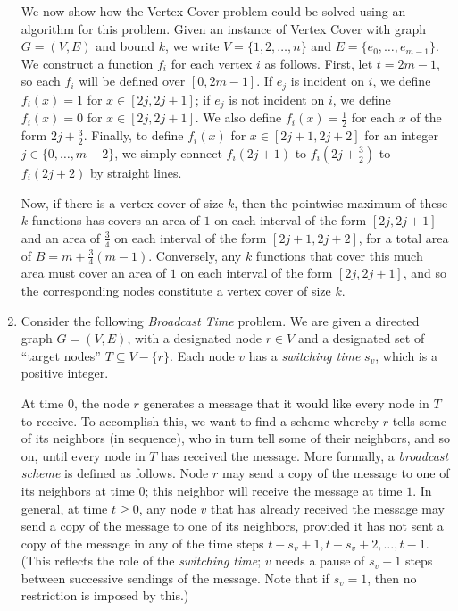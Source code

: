 \documentclass[12pt]{article}
\begin{document}
\begin{enumerate}
{We now show how the Vertex Cover problem could be 
solved using an algorithm for this problem.
Given an instance of Vertex Cover with graph $G = (V,E)$
and bound $k$, we write $V = \{1, 2, \ldots, n\}$ and
$E = \{e_0, \ldots, e_{m-1}\}$.
We construct a function $f_i$ for each vertex $i$ as follows.
First, let $t = 2m-1$, so each $f_i$ will be defined over $[0,2m-1]$.
If $e_j$ is incident on $i$, we define 
$f_i(x) = 1$ for $x \in [2j, 2j+1]$;
if $e_j$ is not incident on $i$, we define 
$f_i(x) = 0$ for $x \in [2j, 2j+1]$.
We also define $f_i(x) = \frac12$ for each $x$
of the form $2j + \frac32$.
Finally, to define $f_i(x)$ for $x \in [2j + 1, 2j + 2]$
for an integer $j \in \{0, \ldots, m-2\}$,
we simply connect $f_i(2j+1)$ to 
$f_i(2j + \frac32)$ to $f_i(2j + 2)$ by straight lines.

Now, if there is a vertex cover of size $k$, then
the pointwise maximum of these $k$ functions
has covers an area of $1$ on each interval of the form
$[2j, 2j + 1]$ and an area of $\frac34$ on each 
interval of the form $[2j + 1, 2j + 2]$,
for a total area of $B = m + \frac34(m-1)$.
Conversely, any $k$ functions that cover this much area
must cover an area of $1$ on each interval of the form
$[2j, 2j + 1]$, and so the corresponding nodes constitute a vertex
cover of size $k$.

}


\item 

Consider the following {\em Broadcast Time} problem.
We are given a directed graph $G = (V,E)$, with a designated node $r \in V$
and a designated set of ``target nodes'' $T \subseteq V - \{r\}$.
Each node $v$ has a {\em switching time} $s_v$, which is a positive integer.

At time $0$, the node $r$ generates a message that it would
like every node in $T$ to receive.
To accomplish this, we want to find a scheme whereby
$r$ tells some of its neighbors (in sequence), who in turn
tell some of their neighbors, and so on, until every node in $T$
has received the message.
More formally, a {\em broadcast scheme} is defined as follows.
Node $r$ may send a copy of the message to one of its
neighbors at time $0$; this neighbor will receive the message at time $1$.
In general, at time $t \geq 0$,
any node $v$ that has already received the message
may send a copy of the message to one of its neighbors, provided it has
not sent a copy of the message in any of the time steps
$t - s_v + 1, t - s_v + 2, \ldots, t - 1$.
(This reflects the role of the {\em switching time};
$v$ needs a pause of $s_v - 1$ steps between successive
sendings of the message.
Note that if $s_v = 1$, then no restriction is imposed by this.)


\end{enumerate}
\end{document}
